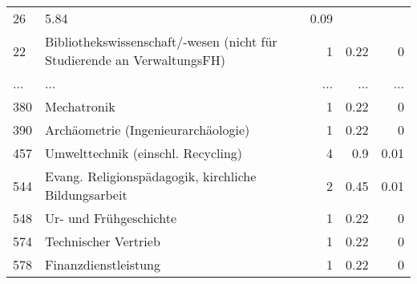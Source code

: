 \begin{longtable}{lXrrr}
          \num{26} &
          \num[round-mode=places,round-precision=2]{5,84} &
          \num[round-mode=places,round-precision=2]{0,09} \\
        22 & \multicolumn{1}{X}{Bibliothekswissenschaft/-wesen (nicht für Studierende an VerwaltungsFH)} & %
          \num{1} &
          \num[round-mode=places,round-precision=2]{0,22} &
          \num[round-mode=places,round-precision=2]{0} \\
       ... & ... & ... & ... & ... \\
        380 & \multicolumn{1}{X}{Mechatronik} & %
          \num{1} &
          \num[round-mode=places,round-precision=2]{0,22} &
          \num[round-mode=places,round-precision=2]{0} \\

        390 & \multicolumn{1}{X}{Archäometrie (Ingenieurarchäologie)} & %
          \num{1} &
          \num[round-mode=places,round-precision=2]{0,22} &
          \num[round-mode=places,round-precision=2]{0} \\

        457 & \multicolumn{1}{X}{Umwelttechnik (einschl. Recycling)} & %
          \num{4} &
          \num[round-mode=places,round-precision=2]{0,9} &
          \num[round-mode=places,round-precision=2]{0,01} \\

        544 & \multicolumn{1}{X}{Evang. Religionspädagogik, kirchliche Bildungsarbeit} & %
          \num{2} &
          \num[round-mode=places,round-precision=2]{0,45} &
          \num[round-mode=places,round-precision=2]{0,01} \\

        548 & \multicolumn{1}{X}{Ur- und Frühgeschichte} & %
          \num{1} &
          \num[round-mode=places,round-precision=2]{0,22} &
          \num[round-mode=places,round-precision=2]{0} \\

        574 & \multicolumn{1}{X}{Technischer Vertrieb} & %
          \num{1} &
          \num[round-mode=places,round-precision=2]{0,22} &
          \num[round-mode=places,round-precision=2]{0} \\

        578 & \multicolumn{1}{X}{Finanzdienstleistung} & %
          \num{1} &
          \num[round-mode=places,round-precision=2]{0,22} &
          \num[round-mode=places,round-precision=2]{0} \\


\end{longtable}
